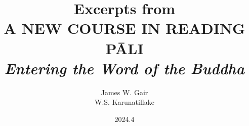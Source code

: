 \documentclass[10pt, b5paper]{ctexbook}
\title{
    Excerpts from\\
    \textbf{A NEW COURSE IN READING PĀLI}\\
    \textit{Entering the Word of the Buddha}
}
\author{James W. Gair\\W.S. Karunatillake}
\date{
    \vspace{\fill}
    2024.4
}
\begin{document}
\maketitle
\thispagestyle{empty}

\mainmatter

\begin{sloppypar}

\let\cleardoublepage\relax

\let\cleardoublepage\relax

\let\cleardoublepage\relax

\let\cleardoublepage\relax

\let\cleardoublepage\relax

\let\cleardoublepage\relax

\let\cleardoublepage\relax

\let\cleardoublepage\relax

\let\cleardoublepage\relax

\let\cleardoublepage\relax

\let\cleardoublepage\relax

\let\cleardoublepage\relax
\end{sloppypar}
\end{document}
